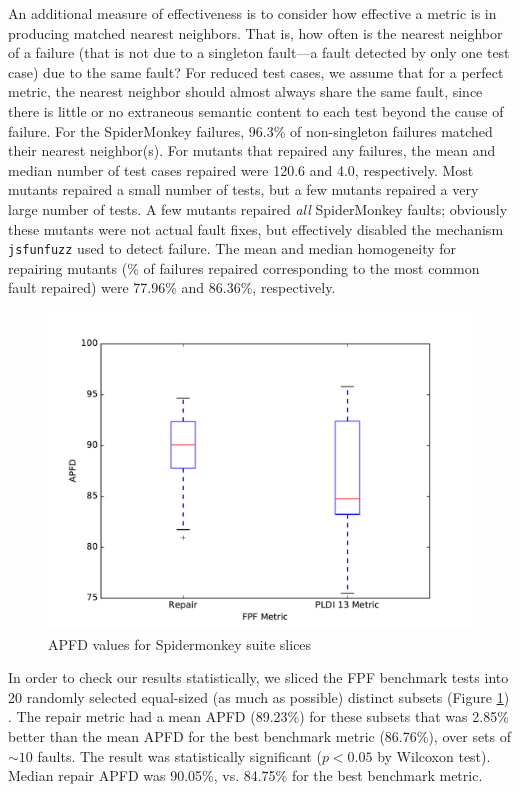 An additional measure of effectiveness is to consider how effective a metric is in producing matched nearest neighbors.  That is, how often is the nearest neighbor of a failure (that is not due to a singleton fault---a fault detected by only one test case) due to the same fault?  For reduced \cite{DD,PLDI13,
CReduce} test cases, we assume that for a perfect metric, the nearest neighbor should almost always share the same fault, since there is little or no extraneous semantic content to each test beyond the cause of failure.  For the SpiderMonkey failures, 96.3\% of non-singleton failures matched their nearest neighbor(s).  For mutants that repaired any failures, the mean and median number of test cases repaired were 120.6 and 4.0, respectively.  Most mutants repaired a small number of tests, but a few mutants repaired a very large number of tests.  A few mutants repaired \emph{all} SpiderMonkey faults; obviously these mutants were not actual fault fixes, but effectively disabled the mechanism {\tt jsfunfuzz} used to detect failure. The mean and median homogeneity for repairing mutants (\% of failures repaired corresponding to the most common fault repaired) were 77.96\% and 86.36\%, respectively.  

\begin{figure}
  \centering
  \includegraphics[width=0.95\columnwidth]{comparejs}
  \caption{APFD values for Spidermonkey suite slices}
  \label{comparejs}
\end{figure}%


In order to check our results statistically, we sliced the FPF benchmark tests into 20 randomly selected equal-sized (as much as possible) distinct subsets (Figure \ref{comparejs}) .  The repair metric had a mean APFD (89.23\%) for these subsets that was 2.85\% better than the mean APFD for the best benchmark metric (86.76\%), over sets of $\sim 10$ faults. The result was statistically significant ($p < 0.05$ by Wilcoxon test).   Median repair APFD was 90.05\%, vs. 84.75\% for the best benchmark metric.



